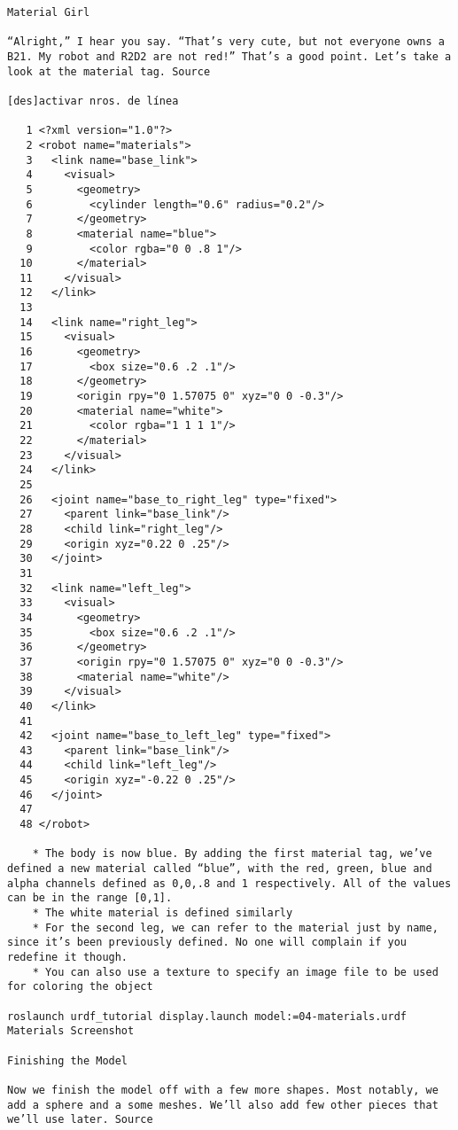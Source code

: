 \begin{verbatim}
Material Girl

“Alright,” I hear you say. “That’s very cute, but not everyone owns a B21. My robot and R2D2 are not red!” That’s a good point. Let’s take a look at the material tag. Source

[des]activar nros. de línea

   1 <?xml version="1.0"?>
   2 <robot name="materials">
   3   <link name="base_link">
   4     <visual>
   5       <geometry>
   6         <cylinder length="0.6" radius="0.2"/>
   7       </geometry>
   8       <material name="blue">
   9         <color rgba="0 0 .8 1"/>
  10       </material>
  11     </visual>
  12   </link>
  13 
  14   <link name="right_leg">
  15     <visual>
  16       <geometry>
  17         <box size="0.6 .2 .1"/>
  18       </geometry>
  19       <origin rpy="0 1.57075 0" xyz="0 0 -0.3"/>
  20       <material name="white">
  21         <color rgba="1 1 1 1"/>
  22       </material>
  23     </visual>
  24   </link>
  25 
  26   <joint name="base_to_right_leg" type="fixed">
  27     <parent link="base_link"/>
  28     <child link="right_leg"/>
  29     <origin xyz="0.22 0 .25"/>
  30   </joint>
  31 
  32   <link name="left_leg">
  33     <visual>
  34       <geometry>
  35         <box size="0.6 .2 .1"/>
  36       </geometry>
  37       <origin rpy="0 1.57075 0" xyz="0 0 -0.3"/>
  38       <material name="white"/>
  39     </visual>
  40   </link>
  41 
  42   <joint name="base_to_left_leg" type="fixed">
  43     <parent link="base_link"/>
  44     <child link="left_leg"/>
  45     <origin xyz="-0.22 0 .25"/>
  46   </joint>
  47 
  48 </robot>

    * The body is now blue. By adding the first material tag, we’ve defined a new material called “blue”, with the red, green, blue and alpha channels defined as 0,0,.8 and 1 respectively. All of the values can be in the range [0,1].
    * The white material is defined similarly
    * For the second leg, we can refer to the material just by name, since it’s been previously defined. No one will complain if you redefine it though.
    * You can also use a texture to specify an image file to be used for coloring the object 

roslaunch urdf_tutorial display.launch model:=04-materials.urdf Materials Screenshot

Finishing the Model

Now we finish the model off with a few more shapes. Most notably, we add a sphere and a some meshes. We’ll also add few other pieces that we’ll use later. Source


\end{verbatim}
